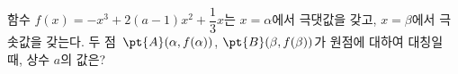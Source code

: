 함수 $f(x)=-x^3+2(a-1)x^2+\dfrac{1}{3}x$는 $x=\alpha$에서 극댓값을 갖고, $x=\beta$에서 극솟값을 갖는다. 두 점~$\pt{A}(\alpha{,}\mkern3mu\mathopen{}f(\alpha))$, $\pt{B}(\beta{,}\mkern3mu\mathopen{}f(\beta))$가 원점에 대하여 대칭일 때, 상수 $a$의 값은?
